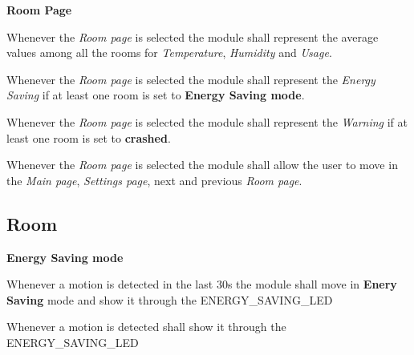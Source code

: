 \begin{req_enum}
\begin{req_enum}[label*=\arabic*.]
				\item \textbf{Room Page}
					\begin{req_enum}[label*=\arabic*.]
						\item Whenever the \textit{Room page} is selected the module shall represent the average values among all the rooms for \textit{Temperature}, \textit{Humidity} and \textit{Usage}.\\
						\item Whenever the \textit{Room page} is selected the module shall represent the \textit{Energy Saving} if at least one room is set to \textbf{Energy Saving mode}.\\
						\item Whenever the \textit{Room page} is selected the module shall represent the \textit{Warning} if at least one room is set to \textbf{crashed}.\\
						\item Whenever the \textit{Room page} is selected the module shall allow the user to move in the \textit{Main page}, \textit{Settings page}, next and previous \textit{Room page}.\\
					\end{req_enum}
			\end{req_enum}
		\end{req_enum}


	\subsection{Room}
		\begin{req_enum}
			\item \textbf{Energy Saving mode}
			\begin{req_enum}[label*=\arabic*.]
				\item Whenever a motion is detected in the last 30s the module shall move in \textbf{Enery Saving} mode and show it through the ENERGY\_SAVING\_LED
				\item Whenever a motion is detected shall show it through the ENERGY\_SAVING\_LED
			\end{req_enum}
		\end{req_enum}